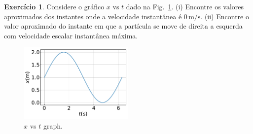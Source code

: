 \documentclass[12pt,a4paper]{article}
\theoremstyle{definition}
\newtheorem{ex}{Exercício}[section]
\begin{document}
\begin{ex}
  Considere o gráfico $x$ vs $t$ dado na Fig.~\ref{fig:xtcurve}. (i)
  Encontre os valores aproximados dos instantes onde a velocidade
  instantânea é $0\,\mathrm{m/s}$. (ii) Encontre o valor aproximado do
  instante em que a partícula se move de direita a esquerda com
  velocidade escalar instantânea máxima.
  \begin{figure}[ht]
    \centering
    \includegraphics[width=0.5\textwidth,keepaspectratio]{xtcurve.pdf}
    \caption{$x$ vs $t$ graph.}
    \label{fig:xtcurve}
  \end{figure}
\end{ex}
\end{document}
